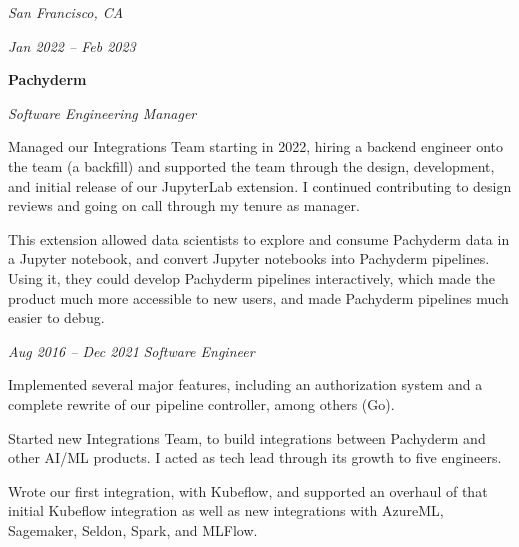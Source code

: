 \documentclass[10pt, letterpaper]{article}
\begin{document}
\vspace{0.2 cm}

\begin{twocolentry}{
    \textit{San Francisco, CA}

    \textit{Jan 2022 – Feb 2023}
}
    \textbf{Pachyderm}

    \textit{Software Engineering Manager}
\end{twocolentry}

\vspace{0.1 cm}

\begin{onecolentry}
    \begin{highlights}
        \item Managed our Integrations Team starting in 2022, hiring a backend engineer onto the team (a backfill) and supported the team through the design, development, and initial release of our JupyterLab extension. I continued contributing to design reviews and going on call through my tenure as manager.
        \item This extension allowed data scientists to explore and consume Pachyderm data in a Jupyter notebook, and convert Jupyter notebooks into Pachyderm pipelines. Using it, they could develop Pachyderm pipelines interactively, which made the product much more accessible to new users, and made Pachyderm pipelines much easier to debug.
    \end{highlights}
\end{onecolentry}

\vspace{0.2 cm}

\begin{twocolentry}{
    \textit{Aug 2016 – Dec 2021}
}
    \textit{Software Engineer}
\end{twocolentry}

\vspace{0.1 cm}

\begin{onecolentry}
    \begin{highlights}
        \item Implemented several major features, including an authorization system and a complete rewrite of our pipeline controller, among others (Go).
        \item Started new Integrations Team, to build integrations between Pachyderm and other AI/ML products. I acted as tech lead through its growth to five engineers.
        \item Wrote our first integration, with Kubeflow, and supported an overhaul of that initial Kubeflow integration as well as new integrations with AzureML, Sagemaker, Seldon, Spark, and MLFlow.
    \end{highlights}
  \end{onecolentry}
\end{document}
